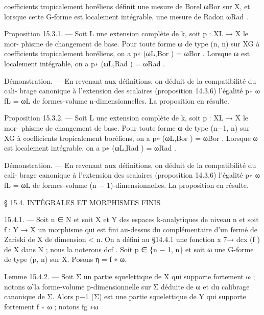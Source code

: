 \documentclass[
  10pt,
]{article}
\newenvironment{Shaded}{}{}
\newcommand{\NormalTok}[1]{#1}
\begin{document}
\begin{Shaded}
\begin{Highlighting}[]
\NormalTok{coefficients tropicalement boréliens définit une mesure de Borel ωBor sur X, et lorsque}
\NormalTok{cette G{-}forme est localement intégrable, une mesure de Radon ωRad .}

\NormalTok{Proposition 15.3.1. — Soit L une extension complète de k, soit p : XL → X le mor{-}}
\NormalTok{phisme de changement de base. Pour toute forme ω de type (n, n) sur XG à coefficients}
\NormalTok{tropicalement boréliens, on a p∗ (ωL,Bor ) = ωBor . Lorsque ω est localement intégrable, on}
\NormalTok{a p∗ (ωL,Rad ) = ωRad .}

\NormalTok{Démonstration. — En revenant aux définitions, on déduit de la compatibilité du cali{-}}
\NormalTok{brage canonique à l’extension des scalaires (proposition 14.3.6) l’égalité p∗ ω}
\NormalTok{                                                                              fL = ωL de}
\NormalTok{formes{-}volume n{-}dimensionnelles. La proposition en résulte.}

\NormalTok{Proposition 15.3.2. — Soit L une extension complète de k, soit p : XL → X le mor{-}}
\NormalTok{phisme de changement de base. Pour toute forme ω de type (n−1, n) sur XG à coefficients}
\NormalTok{tropicalement boréliens, on a p∗ (ωL,Bor ) = ωBor . Lorsque ω est localement intégrable, on}
\NormalTok{a p∗ (ωL,Rad ) = ωRad .}

\NormalTok{Démonstration. — En revenant aux définitions, on déduit de la compatibilité du cali{-}}
\NormalTok{brage canonique à l’extension des scalaires (proposition 14.3.6) l’égalité p∗ ω}
\NormalTok{                                                                              fL = ωL de}
\NormalTok{formes{-}volume (n − 1){-}dimensionnelles. La proposition en résulte.}




\NormalTok{               § 15.4. INTÉGRALES ET MORPHISMES FINIS}

\NormalTok{15.4.1. — Soit n ∈ N et soit X et Y des espaces k{-}analytiques de niveau n et soit}
\NormalTok{f : Y → X un morphisme qui est fini au{-}dessus du complémentaire d’un fermé de Zariski}
\NormalTok{de X de dimension \textless{} n. On a défini au §14.4.1 une fonction x 7→ dcx (f ) de X dans N ;}
\NormalTok{nous la noterons dcf .}
\NormalTok{   Soit p ∈ \{n − 1, n\} et soit ω une G{-}forme de type (p, n) sur X. Posons η = f ∗ ω.}

\NormalTok{Lemme 15.4.2. — Soit Σ un partie squelettique de X qui supporte fortement ω ; notons}
\NormalTok{ω̃ la forme{-}volume p{-}dimensionnelle sur Σ déduite de ω et du calibrage canonique de Σ.}
\NormalTok{   Alors p−1 (Σ) est une partie squelettique de Y qui supporte fortement f ∗ ω ; notons fg}
\NormalTok{                                                                                         ∗ω}


\end{Highlighting}
\end{Shaded}
\end{document}
